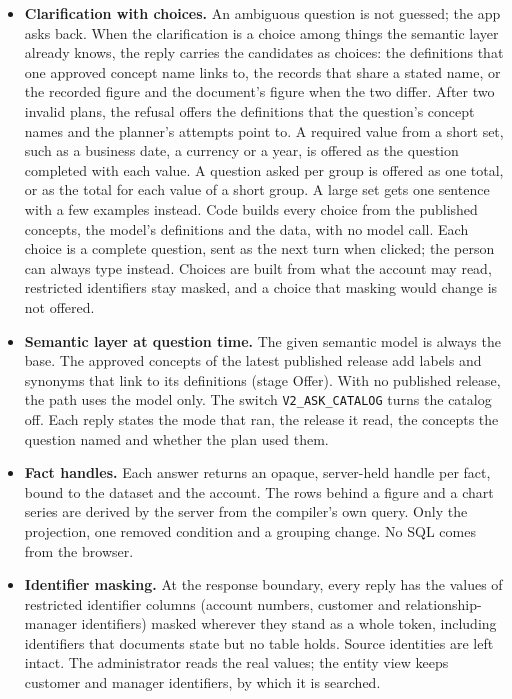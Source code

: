 \documentclass[11pt,a4paper]{article}
\begin{document}
\begin{itemize}[nosep]
\item \textbf{Clarification with choices.} An ambiguous question is not guessed; the app asks back. When the clarification is a choice among things the semantic layer already knows, the reply carries the candidates as choices: the definitions that one approved concept name links to, the records that share a stated name, or the recorded figure and the document's figure when the two differ. After two invalid plans, the refusal offers the definitions that the question's concept names and the planner's attempts point to. A required value from a short set, such as a business date, a currency or a year, is offered as the question completed with each value. A question asked per group is offered as one total, or as the total for each value of a short group. A large set gets one sentence with a few examples instead. Code builds every choice from the published concepts, the model's definitions and the data, with no model call. Each choice is a complete question, sent as the next turn when clicked; the person can always type instead. Choices are built from what the account may read, restricted identifiers stay masked, and a choice that masking would change is not offered. %
\item \textbf{Semantic layer at question time.} The given semantic model is always the base. The approved concepts of the latest published release add labels and synonyms that link to its definitions (stage Offer). With no published release, the path uses the model only. The switch \texttt{V2\_ASK\_CATALOG} turns the catalog off. Each reply states the mode that ran, the release it read, the concepts the question named and whether the plan used them. %
\item \textbf{Fact handles.} Each answer returns an opaque, server-held handle per fact, bound to the dataset and the account. The rows behind a figure and a chart series are derived by the server from the compiler's own query. Only the projection, one removed condition and a grouping change. No SQL comes from the browser. %
\item \textbf{Identifier masking.} At the response boundary, every reply has the values of restricted identifier columns (account numbers, customer and relationship-manager identifiers) masked wherever they stand as a whole token, including identifiers that documents state but no table holds. Source identities are left intact. The administrator reads the real values; the entity view keeps customer and manager identifiers, by which it is searched. %

\end{itemize}
\end{document}
